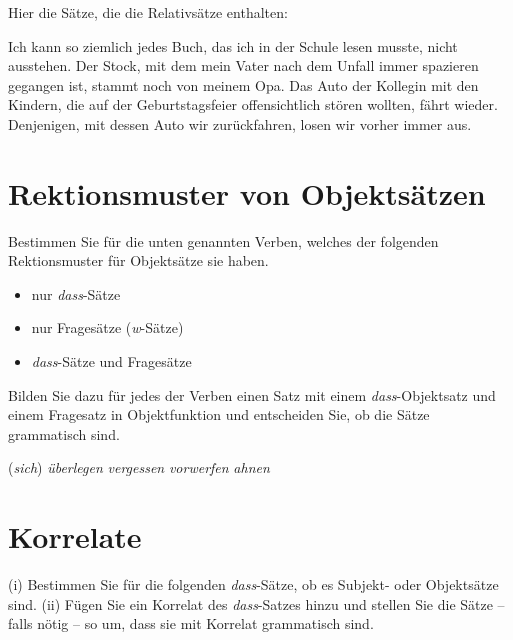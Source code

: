 \Halbzeile

Hier die Sätze, die die Relativsätze enthalten:

\begin{exe}
\setcounter{xnumi}{0}
  \ex Ich kann so ziemlich jedes Buch, das ich in der Schule lesen musste, nicht ausstehen.
  \ex Der Stock, mit dem mein Vater nach dem Unfall immer spazieren gegangen ist, stammt noch von meinem Opa.
  \ex Das Auto der Kollegin mit den Kindern, die auf der Geburtstagsfeier offensichtlich stören wollten, fährt wieder.
  \ex Denjenigen, mit dessen Auto wir zurückfahren, losen wir vorher immer aus.
\end{exe}

\newpage

\section{Rektionsmuster von Objektsätzen}\label{sec:nebensaetze}

Bestimmen Sie für die unten genannten Verben, welches der folgenden Rektionsmuster für Objektsätze sie haben.

\begin{itemize}\Lf
  \item nur \textit{dass}-Sätze
  \item nur Fragesätze (\textit{w}-Sätze)
  \item \textit{dass}-Sätze und Fragesätze
\end{itemize}

Bilden Sie dazu für jedes der Verben einen Satz mit einem \textit{dass}-Objektsatz und einem Fragesatz in Objektfunktion und entscheiden Sie, ob die Sätze grammatisch sind.

\begin{exe}
\setcounter{xnumi}{0}
\ex (\textit{sich}) \textit{überlegen} %
  \ex \textit{vergessen} %
  \ex \textit{vorwerfen} %
  \ex \textit{ahnen} %
\end{exe}

\section{Korrelate}\label{sec:korrelate}

(i) Bestimmen Sie für die folgenden \textit{dass}-Sätze, ob es Subjekt- oder Objektsätze sind.
(ii) Fügen Sie ein Korrelat des \textit{dass}-Satzes hinzu und stellen Sie die Sätze -- falls nötig -- so um, dass sie mit Korrelat grammatisch sind.



